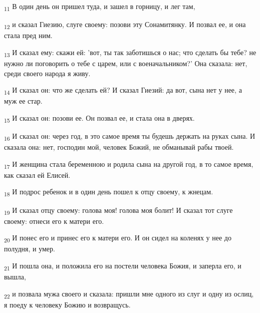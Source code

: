 \begin{tcolorbox}
\textsubscript{11} В один день он пришел туда, и зашел в горницу, и лег там,
\end{tcolorbox}
\begin{tcolorbox}
\textsubscript{12} и сказал Гиезию, слуге своему: позови эту Сонамитянку. И позвал ее, и она стала пред ним.
\end{tcolorbox}
\begin{tcolorbox}
\textsubscript{13} И сказал ему: скажи ей: 'вот, ты так заботишься о нас; что сделать бы тебе? не нужно ли поговорить о тебе с царем, или с военачальником?' Она сказала: нет, среди своего народа я живу.
\end{tcolorbox}
\begin{tcolorbox}
\textsubscript{14} И сказал он: что же сделать ей? И сказал Гиезий: да вот, сына нет у нее, а муж ее стар.
\end{tcolorbox}
\begin{tcolorbox}
\textsubscript{15} И сказал он: позови ее. Он позвал ее, и стала она в дверях.
\end{tcolorbox}
\begin{tcolorbox}
\textsubscript{16} И сказал он: через год, в это самое время ты будешь держать на руках сына. И сказала она: нет, господин мой, человек Божий, не обманывай рабы твоей.
\end{tcolorbox}
\begin{tcolorbox}
\textsubscript{17} И женщина стала беременною и родила сына на другой год, в то самое время, как сказал ей Елисей.
\end{tcolorbox}
\begin{tcolorbox}
\textsubscript{18} И подрос ребенок и в один день пошел к отцу своему, к жнецам.
\end{tcolorbox}
\begin{tcolorbox}
\textsubscript{19} И сказал отцу своему: голова моя! голова моя болит! И сказал тот слуге своему: отнеси его к матери его.
\end{tcolorbox}
\begin{tcolorbox}
\textsubscript{20} И понес его и принес его к матери его. И он сидел на коленях у нее до полудня, и умер.
\end{tcolorbox}
\begin{tcolorbox}
\textsubscript{21} И пошла она, и положила его на постели человека Божия, и заперла его, и вышла,
\end{tcolorbox}
\begin{tcolorbox}
\textsubscript{22} и позвала мужа своего и сказала: пришли мне одного из слуг и одну из ослиц, я поеду к человеку Божию и возвращусь.
\end{tcolorbox}
